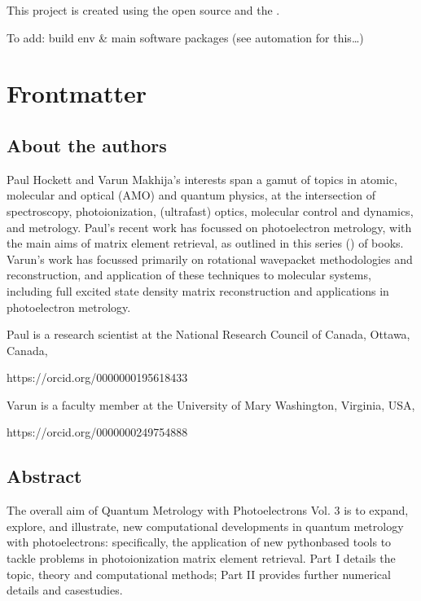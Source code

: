 \documentclass[letterpaper,table,10pt,english]{jupyterBook}
\begin{document}
\sphinxAtStartPar
This project is created using the open source  and the .

\sphinxAtStartPar
To add: build env \& main software packages (see automation for this…)

\sphinxstepscope


\part{Frontmatter}

\sphinxstepscope


\chapter{About the authors}
\label{\detokenize{frontmatter/about_the_authors:about-the-authors}}\label{\detokenize{frontmatter/about_the_authors::doc}}
\sphinxAtStartPar
Paul Hockett and Varun Makhija’s interests span a gamut of topics in atomic, molecular and optical (AMO) and quantum physics, at the intersection of spectroscopy, photoionization, (ultrafast) optics, molecular control and dynamics, and metrology. Paul’s recent work has focussed on photoelectron metrology, with the main aims of matrix element retrieval, as outlined in this series () of books. Varun’s work has focussed primarily on rotational wavepacket methodologies and reconstruction, and application of these techniques to molecular systems, including full excited state density matrix reconstruction and applications in photoelectron metrology.

\sphinxAtStartPar
Paul is a research scientist at the National Research Council of Canada, Ottawa, Canada, 

https://orcid.org/0000\sphinxhyphen{}0001\sphinxhyphen{}9561\sphinxhyphen{}8433


\sphinxAtStartPar
Varun is a faculty member at the University of Mary Washington, Virginia, USA, 

https://orcid.org/0000\sphinxhyphen{}0002\sphinxhyphen{}4975\sphinxhyphen{}4888


\sphinxstepscope


\chapter{Abstract}
\label{\detokenize{frontmatter/abstract:abstract}}\label{\detokenize{frontmatter/abstract::doc}}
\sphinxAtStartPar
The overall aim of Quantum Metrology with Photoelectrons Vol. 3 is to expand, explore, and illustrate, new computational developments in quantum metrology with photoelectrons: specifically, the application of new python\sphinxhyphen{}based tools to tackle problems in photoionization matrix element retrieval. Part I details the topic, theory and computational methods; Part II provides further numerical details and case\sphinxhyphen{}studies.
\end{document}
